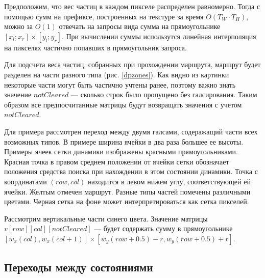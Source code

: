 Предположим, что вес частиц в каждом пикселе распределен равномерно. Тогда с помощью
сумм на префиксе, построенных на текстуре за время $O(T_W \cdot T_H)$, можно за $O(1)$
отвечать на запросы вида сумма на прямоугольнике $[x_l ; x_r] \times [y_l ; y_r]$.
При вычислении суммы использутся линейная интерполяция на пикселях частично попавших
в прямоугольник запроса.


Для подсчета веса частиц, собранных при прохождении маршрута, маршрут будет разделен на
части разного типа (рис. \ref{dpzones}). Как видно из картинки некоторые части могут
быть частично учтены ранее, поэтому важно знать значение $notCleared$ --- сколько строк
было пропущено без галсирования. Таким образом все предпосчитанные матрицы будут возвращать
значения с учетом $notCleared$.

Для примера рассмотрен переход между двумя галсами, содеражащий части всех возможных типов.
В примере ширина ячейки в два раза большее ее высоты. Примеры ячеек сетки динамики 
изображены красными прямоугольниками. Красная точка в правом среднем положении от
ячейки сетки обозначает положения средства поиска при нахождении в этом состоянии динамики.
Точка с координатами $(row, col)$ находится в левом нижем углу, соответствующей ей ячейки.
Желтым отмечен маршрут. Разные типы частей помечены различными цветами. Черная сетка на
фоне может интерпретироваться как сетка пикселей.

Рассмотрим вертикальные части синего цвета. Значение матрицы $v[row][col][notCleared]$ ---
будет содержать сумму в прямоугольнике
$[w_x(col), w_x(col+1)] \times [w_y(row+0.5)-r, w_y(row+0.5)+r]$.

\FloatBarrier
\subsection{Переходы между состояниями}
